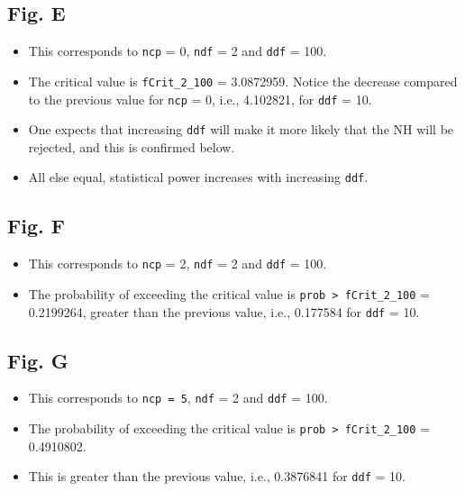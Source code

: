 \documentclass[]{book}
\providecommand{\tightlist}{%
  \setlength{\itemsep}{0pt}\setlength{\parskip}{0pt}}
\begin{document}
\hypertarget{fig.-e}{%
\subsection{Fig. E}\label{fig.-e}}

\begin{itemize}
\tightlist
\item
  This corresponds to \texttt{ncp} = 0, \texttt{ndf} = 2 and \texttt{ddf} = 100.
\item
  The critical value is \texttt{fCrit\_2\_100} = 3.0872959. Notice the decrease compared to the previous value for \texttt{ncp} = 0, i.e., 4.102821, for \texttt{ddf} = 10.
\item
  One expects that increasing \texttt{ddf} will make it more likely that the NH will be rejected, and this is confirmed below.
\item
  All else equal, statistical power increases with increasing \texttt{ddf}.
\end{itemize}

\hypertarget{fig.-f}{%
\subsection{Fig. F}\label{fig.-f}}

\begin{itemize}
\tightlist
\item
  This corresponds to \texttt{ncp} = 2, \texttt{ndf} = 2 and \texttt{ddf} = 100.
\item
  The probability of exceeding the critical value is \texttt{prob\ \textgreater{}\ fCrit\_2\_100} = 0.2199264, greater than the previous value, i.e., 0.177584 for \texttt{ddf} = 10.
\end{itemize}

\hypertarget{fig.-g}{%
\subsection{Fig. G}\label{fig.-g}}

\begin{itemize}
\tightlist
\item
  This corresponds to \texttt{ncp\ =\ 5}, \texttt{ndf} = 2 and \texttt{ddf} = 100.
\item
  The probability of exceeding the critical value is \texttt{prob\ \textgreater{}\ fCrit\_2\_100} = 0.4910802.
\item
  This is greater than the previous value, i.e., 0.3876841 for \texttt{ddf} = 10.
\end{itemize}
\end{document}
